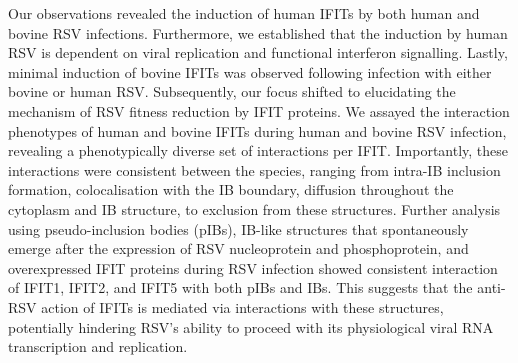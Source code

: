 Our observations revealed the induction of human IFITs by both human and bovine RSV infections. Furthermore, we established that the induction by human RSV is dependent on viral replication and functional interferon signalling. Lastly, minimal induction of bovine IFITs was observed following infection with either bovine or human RSV. Subsequently, our focus shifted to elucidating the mechanism of RSV fitness reduction by IFIT proteins. We assayed the interaction phenotypes of human and bovine IFITs during human and bovine RSV infection, revealing a phenotypically diverse set of interactions per IFIT. Importantly, these interactions were consistent between the species, ranging from intra-IB inclusion formation, colocalisation with the IB boundary, diffusion throughout the cytoplasm and IB structure, to exclusion from these structures. Further analysis using pseudo-inclusion bodies (pIBs), IB-like structures that spontaneously emerge after the expression of RSV nucleoprotein and phosphoprotein, and overexpressed IFIT proteins during RSV infection showed consistent interaction of IFIT1, IFIT2, and IFIT5 with both pIBs and IBs. This suggests that the anti-RSV action of IFITs is mediated via interactions with these structures, potentially hindering RSV's ability to proceed with its physiological viral RNA transcription and replication.

